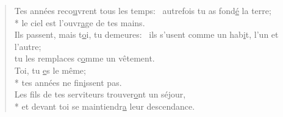 \begin{verse}
Tes années reco\underline{u}vrent tous les temps:~\psalmdagger
{}autrefois tu as fond\underline{é} la terre; \\*
le ciel est l’ouvr\underline{a}ge de tes mains. \\

Ils passent, mais t\underline{o}i, tu demeures:~\psalmdagger
ils s’usent comme un hab\underline{i}t, l’un et l’autre; \\
tu les remplaces c\underline{o}mme un vêtement. \\

Toi, tu \underline{e}s le même; \\*
tes années ne fin\underline{i}ssent pas. \\
Les fils de tes serviteurs trouver\underline{o}nt un séjour, \\*
et devant toi se maintiendr\underline{a} leur descendance. \\
\end{verse}

